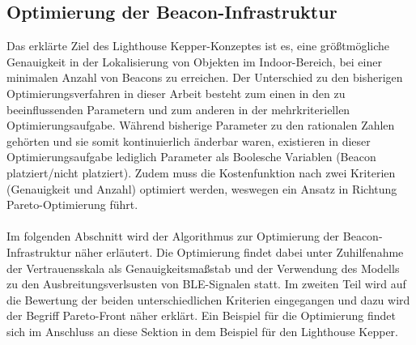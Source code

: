 \subsection{Optimierung der Beacon-Infrastruktur}
Das erklärte Ziel des Lighthouse Kepper-Konzeptes ist es, eine größtmögliche Genauigkeit in der Lokalisierung von Objekten im Indoor-Bereich, bei einer minimalen Anzahl von Beacons zu erreichen. Der Unterschied zu den bisherigen Optimierungsverfahren in dieser Arbeit besteht zum einen in den zu beeinflussenden Parametern und zum anderen in der mehrkriteriellen Optimierungsaufgabe. Während bisherige Parameter zu den rationalen Zahlen gehörten und sie somit kontinuierlich änderbar waren, existieren in dieser Optimierungsaufgabe lediglich Parameter als Boolesche Variablen (Beacon platziert/nicht platziert). Zudem muss die Kostenfunktion nach zwei Kriterien (Genauigkeit und Anzahl) optimiert werden, weswegen ein Ansatz in Richtung Pareto-Optimierung führt. \\ \\
Im folgenden Abschnitt wird der Algorithmus zur Optimierung der Beacon-Infrastruktur näher erläutert. Die Optimierung findet dabei unter Zuhilfenahme der Vertrauensskala als Genauigkeitsmaßstab und der Verwendung des Modells zu den Ausbreitungsverlsusten von BLE-Signalen statt. Im zweiten Teil wird auf die Bewertung der beiden unterschiedlichen Kriterien eingegangen und dazu wird der Begriff Pareto-Front näher erklärt. Ein Beispiel für die Optimierung findet sich im Anschluss an diese Sektion in dem Beispiel für den Lighthouse Kepper.  
